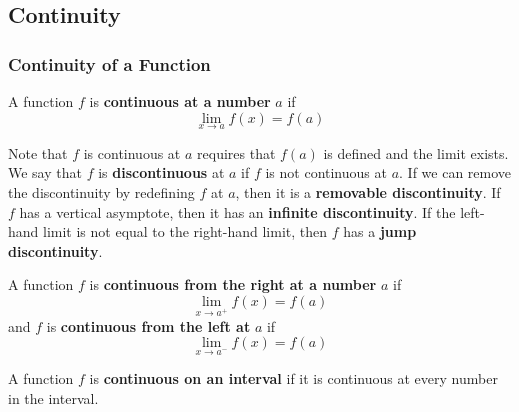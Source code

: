 \subsection{Continuity}

\subsubsection*{Continuity of a Function}
\begin{definition}
    A function \(f\) is \textbf{continuous at a number} \(a\) if
    \[\lim_{x\to a}f(x)=f(a)\]
\end{definition}
Note that \(f\)  is continuous at \(a\) requires that \(f(a)\) is defined and
the limit exists.
We say that \(f\) is \textbf{discontinuous} at \(a\) if \(f\) is not
continuous at \(a\).
If we can remove the discontinuity by redefining \(f\) at \(a\),
then it is a \textbf{removable discontinuity}.
If \(f\) has a vertical asymptote,
then it has an \textbf{infinite discontinuity}.
If the left-hand limit is not equal to the right-hand limit,
then \(f\) has a \textbf{jump discontinuity}.
\begin{definition}
    A function \(f\) is \textbf{continuous from the right at a number} \(a\)
    if
    \[\lim_{x\to a^+}f(x)=f(a)\]
    and \(f\) is \textbf{continuous from the left at} \(a\) if
    \[\lim_{x\to a^-}f(x)=f(a)\]
\end{definition}
\begin{definition}
    A function \(f\) is \textbf{continuous on an interval} if it is continuous
    at every number in the interval.
\end{definition}

